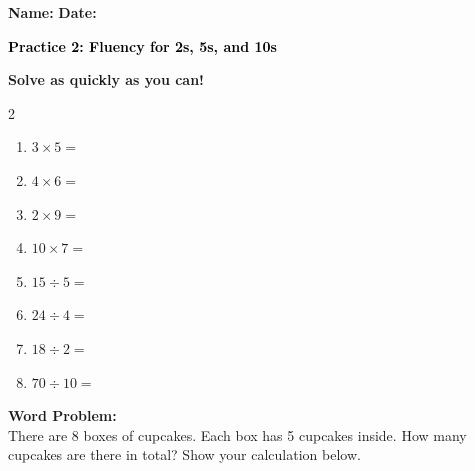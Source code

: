 \documentclass[12pt, letterpaper, fleqn]{article}
\newcommand{\blank}{\underline{\hspace{2.2cm}}}
\begin{document}
\textbf{Name:} \underline{\hspace{5cm}}
\hfill
\textbf{Date:} \underline{\hspace{3cm}}\\

\begin{tcolorbox}[colback=customteal!20]
    \large\textcolor{black}{\textbf{Practice 2: Fluency for 2s, 5s, and 10s}}
\end{tcolorbox}

\vspace{5mm}
\noindent
\textbf{Solve as quickly as you can!}

\vspace{5mm}
\begin{multicols}{2}
\begin{enumerate}[itemsep=1.2cm]
\item $3 \times 5 =$ \blank
\item $4 \times 6 =$ \blank
\item $2 \times 9 =$ \blank
\item $10 \times 7 =$ \blank
\item $15 \div 5 =$ \blank
\item $24 \div 4 =$ \blank
\item $18 \div 2 =$ \blank
\item $70 \div 10 =$ \blank
\end{enumerate}
\end{multicols}

\vspace{1.5cm}
\noindent
\textbf{Word Problem:}
\\
\noindent
There are 8 boxes of cupcakes. Each box has 5 cupcakes inside. How many cupcakes are there in total? Show your calculation below.
\vspace{3cm}
\end{document}
